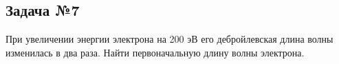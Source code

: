 \subsection{Задача №7}

При увеличении энергии электрона на 200 эВ его дебройлевская длина волны изменилась в два раза. Найти первоначальную длину волны электрона.